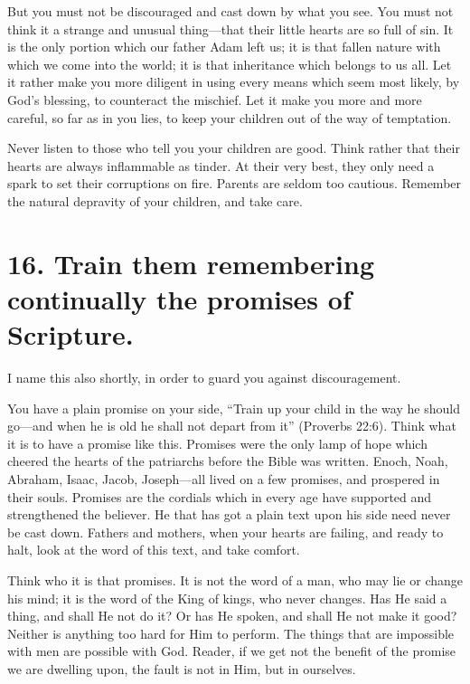 \documentclass[
]{book}
\begin{document}
But you must not be discouraged and cast down by what you see. You must not think it a strange and unusual thing---that their little hearts are so full of sin. It is the only portion which our father Adam left us; it is that fallen nature with which we come into the world; it is that inheritance which belongs to us all. Let it rather make you more diligent in using every means which seem most likely, by God's blessing, to counteract the mischief. Let it make you more and more careful, so far as in you lies, to keep your children out of the way of temptation.

Never listen to those who tell you your children are good. Think rather that their hearts are always inflammable as tinder. At their very best, they only need a spark to set their corruptions on fire. Parents are seldom too cautious. Remember the natural depravity of your children, and take care.

\hypertarget{train-them-remembering-continually-the-promises-of-scripture.}{%
\section*{16. Train them remembering continually the promises of Scripture.}\label{train-them-remembering-continually-the-promises-of-scripture.}}

I name this also shortly, in order to guard you against discouragement.

You have a plain promise on your side, ``Train up your child in the way he should go---and when he is old he shall not depart from it'' (Proverbs 22:6). Think what it is to have a promise like this. Promises were the only lamp of hope which cheered the hearts of the patriarchs before the Bible was written. Enoch, Noah, Abraham, Isaac, Jacob, Joseph---all lived on a few promises, and prospered in their souls. Promises are the cordials which in every age have supported and strengthened the believer. He that has got a plain text upon his side need never be cast down. Fathers and mothers, when your hearts are failing, and ready to halt, look at the word of this text, and take comfort.

Think who it is that promises. It is not the word of a man, who may lie or change his mind; it is the word of the King of kings, who never changes. Has He said a thing, and shall He not do it? Or has He spoken, and shall He not make it good? Neither is anything too hard for Him to perform. The things that are impossible with men are possible with God. Reader, if we get not the benefit of the promise we are dwelling upon, the fault is not in Him, but in ourselves.
\end{document}
